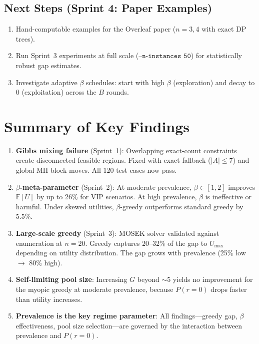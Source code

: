 \documentclass[11pt,a4paper]{article}
\newcommand{\E}{\mathbb{E}}
\begin{document}
\subsection{Next Steps (Sprint 4: Paper Examples)}

\begin{enumerate}
  \item Hand-computable examples for the Overleaf paper ($n=3,4$ with exact DP trees).
  \item Run Sprint~3 experiments at full scale ($\texttt{--n-instances 50}$) for statistically robust gap estimates.
  \item Investigate adaptive $\beta$ schedules: start with high $\beta$ (exploration) and decay to $0$ (exploitation) across the $B$ rounds.
\end{enumerate}


\section{Summary of Key Findings}
\label{sec:summary}

\begin{enumerate}
  \item \textbf{Gibbs mixing failure} (Sprint~1): Overlapping exact-count constraints create disconnected feasible regions. Fixed with exact fallback ($|A| \leq 7$) and global MH block moves. All 120 test cases now pass.

  \item \textbf{$\beta$-meta-parameter} (Sprint~2): At moderate prevalence, $\beta \in [1,2]$ improves $\E[U]$ by up to 26\% for VIP scenarios. At high prevalence, $\beta$ is ineffective or harmful. Under skewed utilities, $\beta$-greedy outperforms standard greedy by 5.5\%.

  \item \textbf{Large-scale greedy} (Sprint~3): MOSEK solver validated against enumeration at $n=20$. Greedy captures 20--32\% of the gap to $U_{\max}$ depending on utility distribution. The gap grows with prevalence (25\% low $\to$ 80\% high).

  \item \textbf{Self-limiting pool size}: Increasing $G$ beyond $\sim$5 yields no improvement for the myopic greedy at moderate prevalence, because $P(r{=}0)$ drops faster than utility increases.

  \item \textbf{Prevalence is the key regime parameter}: All findings---greedy gap, $\beta$ effectiveness, pool size selection---are governed by the interaction between prevalence and $P(r{=}0)$.
\end{enumerate}
\end{document}
